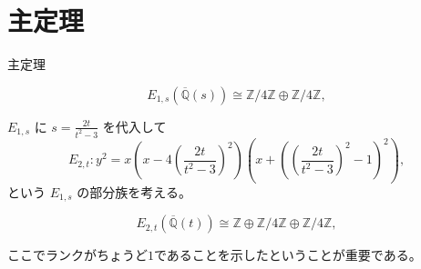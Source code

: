 \documentclass{classes/mybeamer}
\begin{document}
\section{主定理}
\begin{frame}{主定理}
    \begin{proposition}[Y.]
        \begin{equation*}
            E_{1,s}(\overline{\mathbb{Q}}(s)) \cong \mathbb{Z} / 4 \mathbb{Z} \oplus \mathbb{Z} / 4 \mathbb{Z},
        \end{equation*}
    \end{proposition}
    \vspace{1em}

    $E_{1,s}$ に $s = \frac{2t}{t^{2} - 3}$ を代入して
    \begin{equation*}
        E_{2,t}: y^{2} = x \left(x - 4 \left(\frac{2t}{t^{2} - 3} \right)^{2} \right) \left(x + \left(\left(\frac{2t}{t^{2} - 3} \right)^{2} - 1 \right)^{2} \right),
    \end{equation*}
    という $E_{1,s}$ の部分族を考える。
    \begin{thm}[Y.]
        \begin{equation*}
            E_{2,t}(\overline{\mathbb{Q}}(t)) \cong \mathbb{Z} \oplus \mathbb{Z} / 4 \mathbb{Z} \oplus \mathbb{Z} / 4 \mathbb{Z},
        \end{equation*}
    \end{thm}
    ここでランクがちょうど$1$であることを示したということが重要である。
\end{frame}
\end{document}
